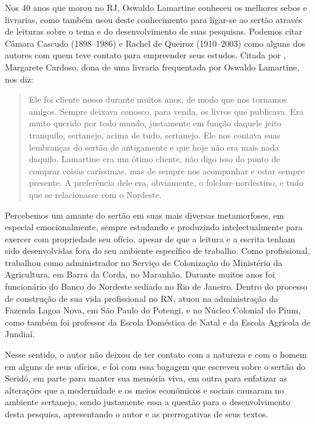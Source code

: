 \begin{refsection}
    Nos 40 anos que morou no RJ, Oswaldo Lamartine conheceu os melhores sebos e livrarias, como também usou deste conhecimento para ligar-se ao sertão através de leituras sobre o tema e do desenvolvimento de suas pesquisas. Podemos citar Câmara Cascudo (1898--1986) e Rachel de Queiroz (1910--2003) como alguns dos autores com quem teve contato para empreender seus estudos. Citada por \textcite[p.~14]{CASTRO2015Areia}, Margarete Cardoso, dona de uma livraria frequentada por Oswaldo Lamartine, nos diz: 

    \begin{quotation}
        Ele foi cliente nosso durante muitos anos, de modo que nos tornamos amigos. Sempre deixava conosco, para venda, os livros que publicava. Era muito querido por todo mundo, justamente em função daquele jeito tranquilo, sertanejo, acima de tudo, sertanejo. Ele nos contava suas lembranças do sertão de antigamente e que hoje não era mais nada daquilo. Lamartine era um ótimo cliente, não digo isso do ponto de comprar coisas caríssimas, mas de sempre nos acompanhar e estar sempre presente. A preferência dele era, obviamente, o folclore nordestino, e tudo que se relacionasse com o Nordeste.  
    \end{quotation}

    Percebemos um amante do sertão em suas mais diversas metamorfoses, em especial emocionalmente, sempre estudando e produzindo intelectualmente para exercer com propriedade seu ofício, apesar de que a leitura e a escrita tenham sido desenvolvidas fora do seu ambiente específico de trabalho. Como profissional, trabalhou como administrador no Serviço de Colonização do Ministério da Agricultura, em Barra da Corda, no Maranhão. Durante muitos anos foi funcionário do Banco do Nordeste sediado no Rio de Janeiro. Dentro do processo de construção de sua vida profissional no RN, atuou na administração da Fazenda Lagoa Nova, em São Paulo do Potengi, e no Núcleo Colonial do Pium, como também foi professor da Escola Doméstica de Natal e da Escola Agrícola de Jundiaí.  

    Nesse sentido, o autor não deixou de ter contato com a natureza e com o homem em alguns de seus ofícios, e foi com essa bagagem que escreveu sobre o sertão do Seridó, em parte para manter sua memória viva, em outra para enfatizar as alterações que a modernidade e os meios econômicos e sociais causaram no ambiente sertanejo, sendo justamente essa a questão para o desenvolvimento desta pesquisa, apresentando o autor e as prerrogativas de seus textos. 



\end{refsection}
